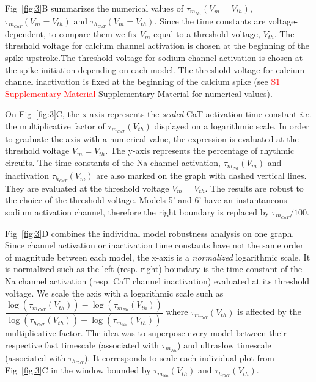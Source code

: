 Fig~\ref{fig:3}B summarizes the numerical values of $\tau_{m_{Na}}(V_m=V_{th})$, $\tau_{m_{CaT}}(V_m=V_{th})$ and $\tau_{h_{CaT}}(V_m=V_{th})$.  Since the time constants are voltage-dependent, to compare them we fix $V_m$ equal to a threshold voltage, $V_{th}$. The threshold voltage for calcium channel activation is chosen at the beginning of the spike upstroke.The threshold voltage for sodium channel activation is chosen at the spike initiation depending on each model.  The threshold voltage for calcium channel inactivation is fixed at the beginning of the calcium spike (see \textcolor{red}{S1 Supplementary Material} Supplementary Material for numerical values). 

On Fig~\ref{fig:3}C, the x-axis represents the \textit{scaled} CaT activation time constant \textit{i.e.} the multiplicative factor of $\tau_{m_{CaT}}(V_{th})$ displayed on a logarithmic scale. In order to graduate the axis with a numerical value, the expression is evaluated at the threshold voltage $V_m = V_{th}$. The y-axis represents the percentage of rhythmic circuits. The time constants of the Na channel activation,  $\tau_{m_{Na}}(V_m)$ and inactivation $\tau_{h_{CaT}}(V_m)$  are also marked on the graph with dashed vertical lines. They are evaluated at the threshold voltage $V_m = V_{th}$. The results are robust to the choice of the threshold voltage. Models 5' and 6' have an instantaneous sodium activation channel, therefore the right boundary is replaced by $\tau_{m_{CaT}}/100$. 

Fig~\ref{fig:3}D combines the individual model robustness analysis on one graph. Since channel activation or inactivation time constants have not the same order of magnitude between each model,  the x-axis is a \textit{normalized} logarithmic scale. It is normalized such as the left (resp. right) boundary is the time constant  of the Na channel activation (resp. CaT channel inactivation) evaluated at its threshold voltage. We scale the axis with a logarithmic scale such as $\dfrac{\log(\tau_{m_{CaT}}(V_{th}))- \log(\tau_{m_{Na}}(V_{th}))}{ \log\left(\tau_{h_{CaT}}(V_{th})\right)- \log(\tau_{m_{Na}}(V_{th}))}$ where $\tau_{m_{CaT}}(V_{th})$ is affected by the multiplicative factor. The idea was to superpose every model between their respective fast timescale (associated with $\tau_{m_{Na}}$) and ultraslow timescale (associated with $\tau_{h_{CaT}}$). It corresponds to scale each individual plot from Fig~\ref{fig:3}C in the window bounded by  $\tau_{m_{Na}}(V_{th})$ and $\tau_{h_{CaT}}(V_{th})$. 

